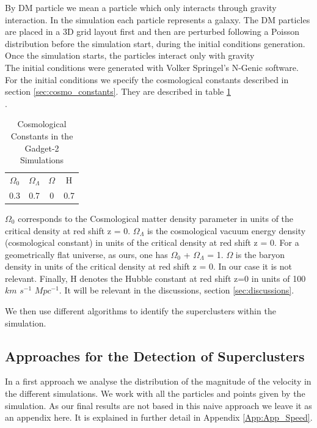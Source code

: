 \documentclass[12pt]{article}
\begin{document}
By DM particle we mean a particle which only
 interacts through gravity
interaction. In the simulation each particle
 represents a galaxy. The DM particles are
placed in a 3D grid layout first and then are
 perturbed following a Poisson distribution
before the simulation start, during the initial
 conditions generation. Once the simulation starts, the particles interact only with gravity\\

The initial conditions were generated with Volker
 Springel's N-Genic software. For the initial
  conditions we specify the cosmological constants
   described in section \ref{sec:cosmo_constants}. They
    are described in table \ref{tab:consts}\\.
   
  
 \begin{table}[ht]
    \centering
    \begin{tabular}{|c|c|c|c|}
        $\Omega_0$ & $\Omega_{\Lambda}$ & $\Omega$ & H \\
        0.3 &  0.7 & 0 & 0.7 \\
    \end{tabular}
    \caption{Cosmological Constants in the Gadget-2 Simulations}
    \label{tab:consts}
\end{table}
\FloatBarrier
$\Omega_0$  corresponds to the Cosmological matter
 density parameter in units of the critical density at
red shift z = 0. $\Omega_{\Lambda}$ is the cosmological
 vacuum energy density (cosmological constant) in
  units of the critical density at red shift z = 0. 
For a geometrically flat universe, as ours, one has
 $\Omega_0$ + $\Omega_{\Lambda}$ = 1.
 $\Omega$ is the baryon density in units
  of the critical density at red shift z = 0. In our
   case it
   is not relevant. Finally, H denotes the Hubble
    constant at red shift z=0 in  units of 100 
    $km$ $s^{-1}$
     $Mpc^{-1}$. It will be relevant in the
      discussions, section \ref{sec:discussions}.

We then use different algorithms to identify the
 superclusters within the simulation.\\

\subsection{Approaches for the Detection of Superclusters} \label{sec:approaches}
\begin{par}
In a first approach we analyse the distribution of
 the magnitude of the velocity in the different
  simulations. We work with all the particles and
   points given by the simulation. As our final
    results are not based in this naive approach
     we leave it as an appendix here. It is
      explained in further detail in Appendix
       \ref{App:App_Speed}.\\
\end{par}
\end{document}
